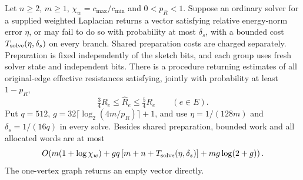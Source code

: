 \begin{theorem}
\label{thm:op3-ordinary-solve-resistances}
Let $n\geq2$, $m\geq1$, $\chi_w=c_{\max}/c_{\min}$ and
$0<p_R<1$. Suppose an ordinary solver for a supplied weighted Laplacian
returns a vector satisfying relative energy-norm error $\eta$, or may
fail to do so with probability at most $\delta_s$, with a bounded cost
$T_{\rm solve}(\eta,\delta_s)$ on every branch. Shared preparation
costs are charged separately. Preparation is fixed independently of the
sketch bits, and each group uses fresh solver state and independent bits.
There is a procedure returning estimates of all original-edge effective
resistances satisfying, jointly with probability at least $1-p_R$,
\[
 \tfrac34 R_e\leq\widehat R_e\leq\tfrac54 R_e\qquad(e\in E).
\]
Put $q=512$, $g=32\lceil\log_2(4m/p_R)\rceil+1$, and use
$\eta=1/(128m)$ and $\delta_s=1/(16q)$ in every solve. Besides shared
preparation, bounded work and all allocated words are at most
\[
 O\!\left(m(1+\log\chi_w)+gq\,[m+n+T_{\rm solve}(\eta,\delta_s)]
             +mg\log(2+g)\right).
\]
The one-vertex graph returns an empty vector directly.
\end{theorem}
